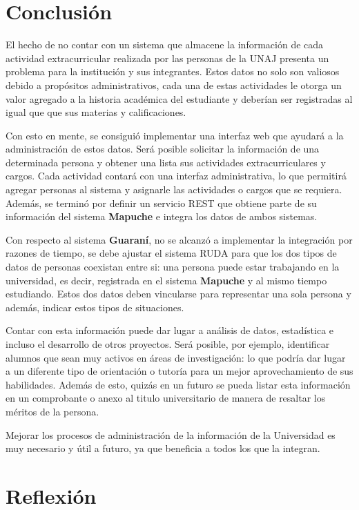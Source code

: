 
\section{Conclusión}
\label{sec:conclusion}
El hecho de no contar con un sistema que almacene la información de cada
actividad extracurricular realizada por las personas de la UNAJ presenta
un problema para la institución y sus integrantes\@. Estos datos
no solo son valiosos debido a propósitos administrativos, cada una de
estas actividades le otorga un valor agregado a la historia académica del
estudiante y deberían ser registradas al igual que que sus
materias y calificaciones.


Con esto en mente, se consiguió implementar una interfaz web que ayudará a la administración
de estos datos. Será posible solicitar la información de una determinada
persona y obtener una lista sus actividades extracurriculares y cargos\@.
Cada actividad contará con una interfaz administrativa, lo que
permitirá agregar personas al sistema y asignarle las actividades o cargos
que se requiera\@. Además, se terminó por definir un servicio REST que
obtiene parte de su información del sistema \textbf{Mapuche} e integra
los datos de ambos sistemas\@.


Con respecto al sistema \textbf{Guaraní}, no se alcanzó a implementar la
integración por razones de tiempo, se debe ajustar el sistema RUDA para
que los dos tipos de datos de personas coexistan entre si: una persona puede
estar trabajando en la universidad, es decir, registrada en el sistema
\textbf{Mapuche} y al mismo tiempo estudiando. Estos dos datos deben
vincularse para representar una sola persona y además, indicar estos tipos
de situaciones.

Contar con esta información puede dar lugar a análisis de datos,
estadística e incluso el desarrollo de otros proyectos. Será posible,
por ejemplo, identificar alumnos que sean muy activos en áreas de
investigación: lo que podría dar lugar a un diferente tipo de orientación
o tutoría para un mejor aprovechamiento de sus habilidades\@. Además de esto, quizás
en un futuro se pueda listar esta información en un comprobante o anexo al titulo universitario
de manera de resaltar los méritos de la persona.

Mejorar los procesos de administración de la información de la Universidad es muy necesario
y útil a futuro, ya que beneficia a todos los que la integran.

\section{Reflexión}%
\label{sec:reflexión}


